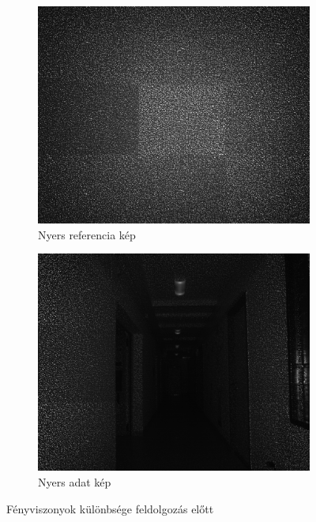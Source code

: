 \begin{figure}[ht!]
	\begin{subfigure}{.5\textwidth}
	  \centering
	  \includegraphics[width=0.9\linewidth]{figures/unproc_ref.png}
	  \caption{Nyers referencia kép}
	  \label{fig:unprocRef}
	\end{subfigure}
	\begin{subfigure}{.5\textwidth}
	  \centering
	  \includegraphics[width=0.9\linewidth]{figures/unproc_data.png}
	  \caption{Nyers adat kép}
	  \label{fig:unprocData}
	\end{subfigure}
	\caption{Fényviszonyok különbsége feldolgozás előtt}
	\label{fig:needToPreproc}
\end{figure}

